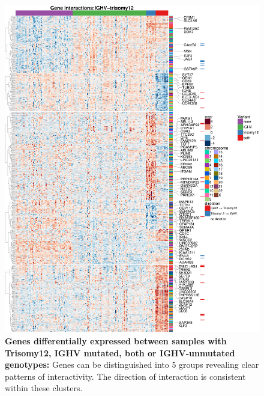 \begin{figure}
	\centering
	\includegraphics[width=\columnwidth]{./Figures/epistatsisTri12IGHV.pdf}
	\caption{\textbf{Genes differentially expressed between samples with Trisomy12, IGHV mutated, both or IGHV-unmutated genotypes:} Genes can be distinguished into 5 groups revealing clear patterns of interactivity. The direction of interaction is consistent within these clusters.}
	\label{fig:epistasisTri12IGHV}
\end{figure}

\FloatBarrier

